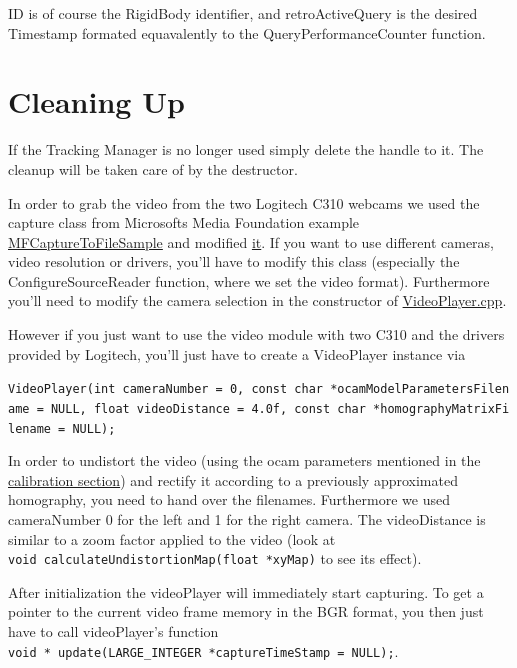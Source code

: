 \documentclass[]{article}
\begin{document}
ID is of course the RigidBody identifier, and retroActiveQuery is the
desired Timestamp formated equavalently to the QueryPerformanceCounter
function.

\section{Cleaning Up}\label{cleaning-up}

If the Tracking Manager is no longer used simply delete the handle to
it. The cleanup will be taken care of by the destructor. 

In order to grab the video from the two Logitech C310 webcams we used the capture
class from Microsofts Media Foundation example
\href{https://msdn.microsoft.com/en-us/library/windows/desktop/ee663604\%28v=vs.85\%29.aspx}{MFCaptureToFileSample}
and modified
\href{https://github.com/ands/OculusMeetsAR/blob/master/ARLib/src/Video/CCapture.cpp}{it}.
If you want to use different cameras, video resolution or drivers,
you'll have to modify this class (especially the ConfigureSourceReader
function, where we set the video format). Furthermore you'll need to
modify the camera selection in the constructor of
\href{https://github.com/ands/OculusMeetsAR/blob/master/ARLib/src/Video/videoplayer.cpp}{VideoPlayer.cpp}.

However if you just want to use the video module with two C310 and the
drivers provided by Logitech, you'll just have to create a VideoPlayer
instance via

\texttt{VideoPlayer(int\ cameraNumber\ =\ 0,\ const\ char\ *ocamModelParametersFilename\ =\ NULL,\ float\ videoDistance\ =\ 4.0f,\ const\ char\ *homographyMatrixFilename\ =\ NULL);}

In order to undistort the video (using the ocam parameters mentioned in
the
\href{https://github.com/ands/OculusMeetsAR/wiki/Calibration}{calibration
section}) and rectify it according to a previously approximated
homography, you need to hand over the filenames. Furthermore we used
cameraNumber 0 for the left and 1 for the right camera. The
videoDistance is similar to a zoom factor applied to the video (look at
\texttt{void\ calculateUndistortionMap(float\ *xyMap)} to see its
effect).

After initialization the videoPlayer will immediately start capturing.
To get a pointer to the current video frame memory in the BGR format,
you then just have to call videoPlayer's function
\texttt{void\ *\ update(LARGE\_INTEGER\ *captureTimeStamp\ =\ NULL);}.
\end{document}
